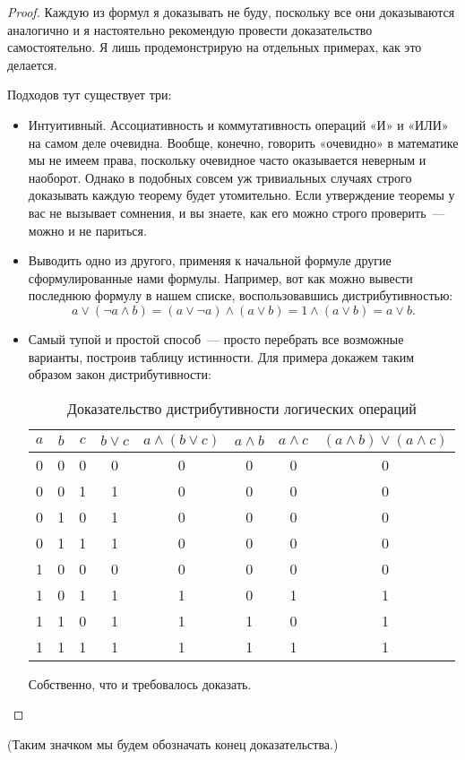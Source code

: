 \begin{proof}
Каждую из формул я доказывать не буду, поскольку все они доказываются аналогично и я настоятельно рекомендую провести доказательство самостоятельно. Я лишь продемонстрирую на отдельных примерах, как это делается.

Подходов тут существует три:
\begin{itemize}
\item Интуитивный. Ассоциативность и коммутативность операций «И» и «ИЛИ» на самом деле очевидна. Вообще, конечно, говорить «очевидно» в математике мы не имеем права, поскольку очевидное часто оказывается неверным и наоборот. Однако в подобных совсем уж тривиальных случаях строго доказывать каждую теорему будет утомительно. Если утверждение теоремы у вас не вызывает сомнения, и вы знаете, как его можно строго проверить~--- можно и не париться.
\item Выводить одно из другого, применяя к начальной формуле другие сформулированные нами формулы. Например, вот как можно вывести последнюю формулу в нашем списке, воспользовавшись дистрибутивностью:
$$
a \lor (\neg a \land b) = (a \lor \neg a) \land (a \lor b) = 1 \land (a \lor b) = a \lor b.
$$

\item Самый тупой и простой способ~--- просто перебрать все возможные варианты, построив таблицу истинности. Для примера докажем таким образом закон дистрибутивности:
\begin{table}[h]
\centering
\begin{tabular}{ccc|cc|ccc}
$a$&$b$&$c$&$b\lor c$&$a\land(b\lor c)$&$a\land b$&$a\land c$&$(a\land b)\lor(a\land c)$\\
\hline
0&0&0&0&0&0&0&0\\
0&0&1&1&0&0&0&0\\
0&1&0&1&0&0&0&0\\
0&1&1&1&0&0&0&0\\
1&0&0&0&0&0&0&0\\
1&0&1&1&1&0&1&1\\
1&1&0&1&1&1&0&1\\
1&1&1&1&1&1&1&1
\end{tabular}
\caption{Доказательство дистрибутивности логических операций}
\end{table}

Собственно, что и требовалось доказать.
\end{itemize}
\end{proof}

(Таким значком мы будем обозначать конец доказательства.)

